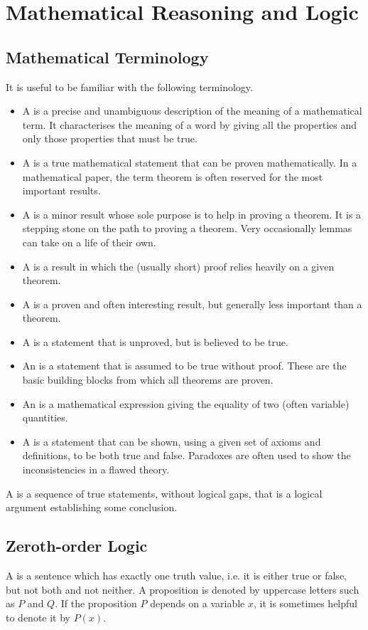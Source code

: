 \chapter{Mathematical Reasoning and Logic}\label{chap:logic-proofs}
\section{Mathematical Terminology}
It is useful to be familiar with the following terminology.
\begin{itemize}
\item A  is a precise and unambiguous description of the meaning of a mathematical term. It characterises the meaning of a word by giving all the properties and only those properties that must be true.
\item A  is a true mathematical statement that can be proven mathematically. In a mathematical paper, the term theorem is often reserved for the most important results.
\item A  is a minor result whose sole purpose is to help in proving a theorem. It is a stepping stone on the path to proving a theorem. Very occasionally lemmas can take on a life of their own.
\item A  is a result in which the (usually short) proof relies heavily on a given theorem.
\item A  is a proven and often interesting result, but generally less important than a theorem.
\item A  is a statement that is unproved, but is believed to be true.
\item An  is a statement that is assumed to be true without proof. These are the basic building blocks from which all theorems are proven.
\item An  is a mathematical expression giving the equality of two (often variable) quantities.
\item A  is a statement that can be shown, using a given set of axioms and definitions, to be both true and false. Paradoxes are often used to show the inconsistencies in a flawed theory.
\end{itemize}

A  is a sequence of true statements, without logical gaps, that is a logical argument establishing some conclusion.

\section{Zeroth-order Logic}
A  is a sentence which has exactly one truth value, i.e. it is either true or false, but not both and not neither. A proposition is denoted by uppercase letters such as $P$ and $Q$. If the proposition $P$ depends on a variable $x$, it is sometimes helpful to denote it by $P(x)$. 

